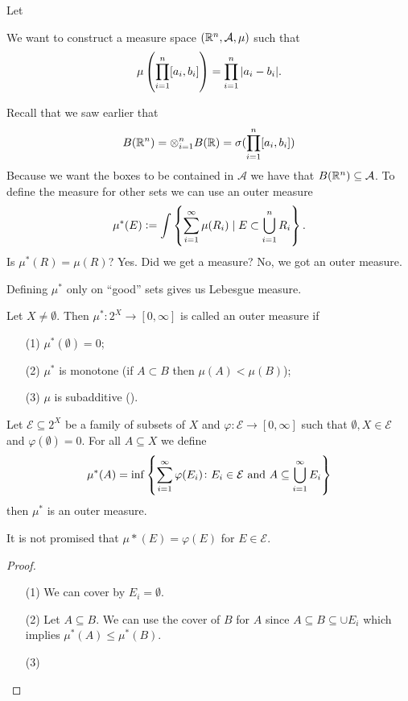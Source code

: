 \documentclass[11pt,a4paper]{article}
\newcommand{\A}{\mathcal A}
\begin{document}
Let 


We want to construct a measure space $(\R^n, \A, \mu)$ such that
\[
  \mu\del{\prod_{i=1}^{n} [a_i,b_i]} =
  \prod_{i=1}^{n} |a_i - b_i|.
\]

Recall that we saw earlier that
\[
  B(\mathbb{R}^n) =
  \otimes_{i=1}^{n} B(\mathbb{R}) =
  \sigma(\prod_{i=1}^{n} [a_i,b_i])
\]
Because we want the boxes to be contained in $\A$ we have that
$B(\R^n) \subseteq \A$.
To define the measure for other sets we can use an outer measure
\[
  \mu^*(E) := \int \set{\sum_{i=1}^{\infty} \mu(R_i) \mid E \subset 
  \bigcup_{i=1}^{n} R_i}.
\]
Is $\mu^*(R) = \mu(R)$? Yes.
Did we get a measure? No, we got an outer measure.
\begin{remark}
  Defining $\mu^*$ only on ``good'' sets gives us Lebesgue measure.
\end{remark}

\begin{definition}
  Let $X \neq \emptyset$. Then $\mu^* \colon 2^X \to [0,\infty]$ is
  called an outer measure if
  \begin{enumerate}
    \item[(1)] $\mu^*(\emptyset) = 0$;
    \item[(2)] $\mu^*$ is monotone (if $A \subset B$ then $\mu(A) < \mu(B)$);
    \item[(3)] $\mu$ is subadditive ().
  \end{enumerate}
\end{definition}

\begin{proposition}
  Let $\mathcal E \subseteq 2^X$ be a family of subsets of $X$ and
  $\varphi \colon \mathcal E \to [0,\infty]$ such that
  $\emptyset, X \in \mathcal E$ and $\varphi(\emptyset) = 0$.
  For all $A \subseteq X$ we define
  \[
    \mu^*(A) = \inf\set{\sum_{i=1}^{\infty} \varphi(E_i) \colon 
    E_i \in \mathcal E \text{ and }A \subseteq \bigcup_{i=1}^{\infty} E_i}
  \]
  then $\mu^*$ is an outer measure.
\end{proposition}
\begin{remark}
  It is not promised that $\mu*(E) = \varphi(E)$ for $E \in \mathcal E$.
\end{remark}
\begin{proof}
\begin{enumerate}
  \item[(1)] We can cover by $E_i = \emptyset$.
  \item[(2)] Let $A \subseteq B$.
    We can use the cover of $B$ for $A$ since 
    $A \subseteq B \subseteq \cup E_i$ which implies $\mu^*(A) \le \mu^*(B)$.
  \item[(3)]
\end{enumerate}
\end{proof}
\end{document}
